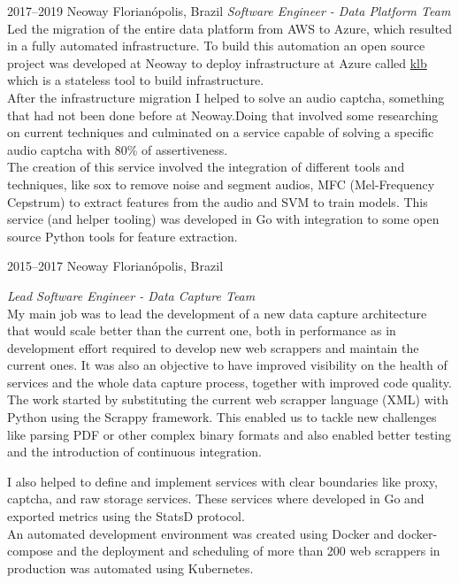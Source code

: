 \documentclass[]{friggeri-cv} %
\begin{document}
\begin{entrylist}
\entry
{2017--2019}
{Neoway}
{Florianópolis, Brazil}
{\emph{Software Engineer - Data Platform Team} \\

Led the migration of the entire data platform from AWS to Azure,
which resulted in a fully automated infrastructure.
To build this automation an open source project was developed
at Neoway to deploy infrastructure at Azure called
{\href{https://github.com/NeowayLabs/klb}{klb}} which is
a stateless tool to build infrastructure.\\

After the infrastructure migration I helped to solve an
audio captcha, something that had not
been done before at Neoway.Doing that involved some researching
on current techniques and culminated on a service capable
of solving a specific audio captcha with 80\% of assertiveness.\\

The creation of this service involved the integration of different
tools and techniques, like sox to remove noise and segment audios,
MFC (Mel-Frequency Cepstrum) to extract features from the audio
and SVM to train models. This service (and helper tooling) was developed in Go
with integration to some open source Python tools for feature extraction.\\
}
\end{entrylist}

\begin{entrylist}
\entry
{2015--2017}
{Neoway}
{Florianópolis, Brazil}
{\emph{Lead Software Engineer - Data Capture Team} \\

My main job was to lead the development of a new
data capture architecture that would scale better than
the current one, both in performance as in development
effort required to develop new web scrappers and maintain
the current ones. It was also an objective to have
improved visibility on the health of services
and the whole data capture process, together with
improved code quality.\\

The work started by substituting the current web scrapper
language (XML) with Python using the Scrappy framework.
This enabled us to tackle new challenges like parsing
PDF or other complex binary formats and also enabled better
testing and the introduction of continuous integration.

I also helped to define and implement services with clear
boundaries like proxy, captcha, and raw storage services.
These services where developed in Go and exported metrics using
the StatsD protocol.\\

An automated development environment was created using
Docker and docker-compose and
the deployment and scheduling of more than 200 web scrappers
in production was automated using Kubernetes.
}
\end{entrylist}
\end{document}
